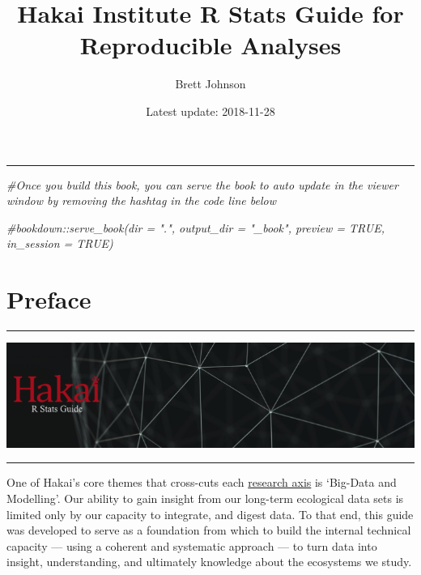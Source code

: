 \documentclass[]{book}
\title{Hakai Institute R Stats Guide for Reproducible Analyses}
\author{Brett Johnson}
\date{Latest update: 2018-11-28}
\newenvironment{Shaded}{\begin{snugshade}}{\end{snugshade}}
\newcommand{\CommentTok}[1]{\textcolor[rgb]{0.56,0.35,0.01}{\textit{#1}}}
\begin{document}
\maketitle

{
\setcounter{tocdepth}{0}
\tableofcontents
}
\begin{center}\rule{0.5\linewidth}{\linethickness}\end{center}

\begin{Shaded}
\begin{Highlighting}[]
\CommentTok{#Once you build this book, you can serve the book to auto update in the viewer window by removing the hashtag in the code line below}

\CommentTok{#bookdown::serve_book(dir = ".", output_dir = "_book", preview = TRUE, in_session = TRUE)}
\end{Highlighting}
\end{Shaded}

\chapter*{Preface}\label{preface}

\begin{center}\rule{0.5\linewidth}{\linethickness}\end{center}

\includegraphics[width=9.97in]{images/r_stats_red}

\begin{center}\rule{0.5\linewidth}{\linethickness}\end{center}

One of Hakai's core themes that cross-cuts each
\href{https://www.hakai.org/research}{research axis} is `Big-Data and
Modelling'. Our ability to gain insight from our long-term ecological
data sets is limited only by our capacity to integrate, and digest data.
To that end, this guide was developed to serve as a foundation from
which to build the internal technical capacity --- using a coherent and
systematic approach --- to turn data into insight, understanding, and
ultimately knowledge about the ecosystems we study.
\end{document}
